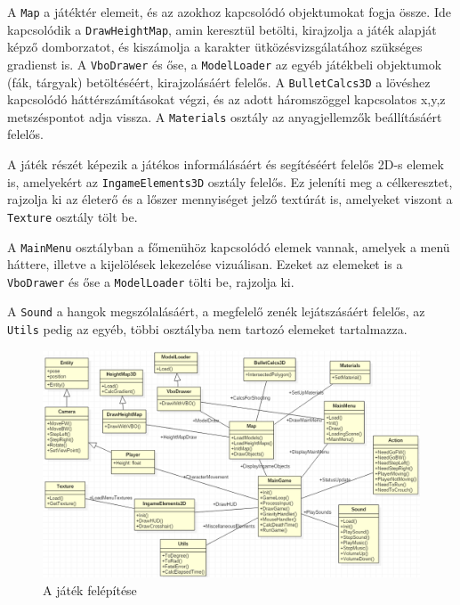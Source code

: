 
A \texttt{Map} a játéktér elemeit, és az azokhoz kapcsolódó objektumokat fogja össze. Ide kapcsolódik a \texttt{DrawHeightMap}, amin keresztül betölti, kirajzolja a játék alapját képző domborzatot, és kiszámolja a karakter ütközésvizsgálatához szükséges gradienst is. A \texttt{VboDrawer} és őse, a \texttt{ModelLoader} az egyéb játékbeli objektumok (fák, tárgyak) betöltéséért, kirajzolásáért felelős. A \texttt{BulletCalcs3D} a lövéshez kapcsolódó háttérszámításokat végzi, és az adott háromszöggel kapcsolatos x,y,z metszéspontot adja vissza. A \texttt{Materials} osztály az anyagjellemzők beállításáért felelős.

A játék részét képezik a játékos informálásáért és segítéséért felelős 2D-s elemek is, amelyekért az \texttt{IngameElements3D} osztály felelős. Ez jeleníti meg a célkeresztet, rajzolja ki az életerő és a lőszer mennyiséget jelző textúrát is, amelyeket viszont a \texttt{Texture} osztály tölt be.

A \texttt{MainMenu} osztályban a főmenühöz kapcsolódó elemek vannak, amelyek a menü háttere, illetve a kijelölések lekezelése vizuálisan. Ezeket az elemeket is a \texttt{VboDrawer} és őse a \texttt{ModelLoader} tölti be, rajzolja ki.

A \texttt{Sound} a hangok megszólalásáért, a megfelelő zenék lejátszásáért felelős, az \texttt{Utils} pedig az egyéb, többi osztályba nem tartozó elemeket tartalmazza.

\begin{figure}[h]
\centering
\includegraphics[scale=0.5]{kepek/uml.png}
\caption{A játék felépítése}
\label{fig:uml}
\end{figure}

